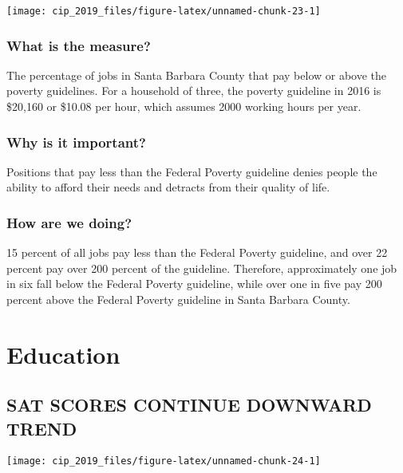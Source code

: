 \documentclass[]{book}
\theoremstyle{definition}
\theoremstyle{definition}
\theoremstyle{definition}
\theoremstyle{remark}
\begin{document}
\texttt{[image: cip\_2019\_files/figure-latex/unnamed-chunk-23-1]}

\subsubsection*{What is the measure?}\label{what-is-the-measure-13}

The percentage of jobs in Santa Barbara County that pay below or above
the poverty guidelines. For a household of three, the poverty guideline
in 2016 is \$20,160 or \$10.08 per hour, which assumes 2000 working
hours per year.

\subsubsection*{Why is it important?}\label{why-is-it-important-11}

Positions that pay less than the Federal Poverty guideline denies people
the ability to afford their needs and detracts from their quality of
life.

\subsubsection*{How are we doing?}\label{how-are-we-doing-15}

15 percent of all jobs pay less than the Federal Poverty guideline, and
over 22 percent pay over 200 percent of the guideline. Therefore,
approximately one job in six fall below the Federal Poverty guideline,
while over one in five pay 200 percent above the Federal Poverty
guideline in Santa Barbara County.

\section*{Education}\label{education}

\subsection*{SAT SCORES CONTINUE DOWNWARD
TREND}\label{sat-scores-continue-downward-trend}

\texttt{[image: cip\_2019\_files/figure-latex/unnamed-chunk-24-1]}
\end{document}
